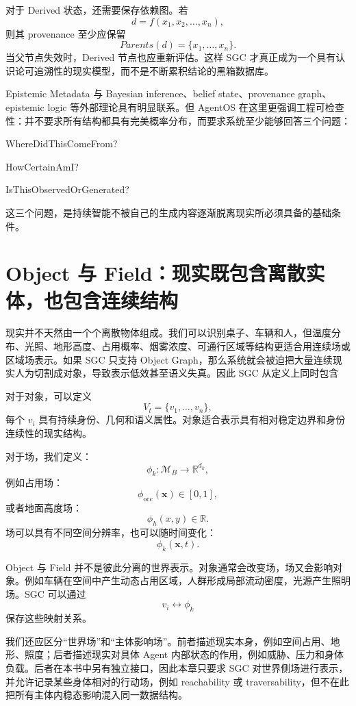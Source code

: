 对于 Derived 状态，还需要保存依赖图。若
\[
d=f(x_1,x_2,\ldots,x_n),
\]
则其 provenance 至少应保留
\[
Parents(d)=\{x_1,\ldots,x_n\}.
\]
当父节点失效时，Derived 节点也应重新评估。这样 SGC 才真正成为一个具有认识论可追溯性的现实模型，而不是不断累积结论的黑箱数据库。

Epistemic Metadata 与 Bayesian inference、belief state、provenance graph、epistemic logic 等外部理论具有明显联系。但 AgentOS 在这里更强调工程可检查性：并不要求所有结构都具有完美概率分布，而要求系统至少能够回答三个问题：
\begin{statementbox}
WhereDidThisComeFrom?
\end{statementbox}
\begin{statementbox}
HowCertainAmI?
\end{statementbox}
\begin{statementbox}
IsThisObservedOrGenerated?
\end{statementbox}
这三个问题，是持续智能不被自己的生成内容逐渐脱离现实所必须具备的基础条件。

\section{Object 与 Field：现实既包含离散实体，也包含连续结构}

现实并不天然由一个个离散物体组成。我们可以识别桌子、车辆和人，但温度分布、光照、地形高度、占用概率、烟雾浓度、可通行区域等结构更适合用连续场或区域场表示。如果 SGC 只支持 Object Graph，那么系统就会被迫把大量连续现实人为切割成对象，导致表示低效甚至语义失真。因此 SGC 从定义上同时包含
\begin{statementbox}
\centering
{}
\end{statementbox}

对于对象，可以定义
\[
V_t=\{v_1,\ldots,v_n\},
\]
每个 $v_i$ 具有持续身份、几何和语义属性。对象适合表示具有相对稳定边界和身份连续性的现实结构。

对于场，我们定义：
\[
\phi_k:
\mathcal M_B
\rightarrow
\mathbb R^{d_k},
\]
例如占用场：
\[
\phi_{\mathrm{occ}}(\mathbf x)\in[0,1],
\]
或者地面高度场：
\[
\phi_h(x,y)\in\mathbb R.
\]
场可以具有不同空间分辨率，也可以随时间变化：
\[
\phi_k(\mathbf x,t).
\]

Object 与 Field 并不是彼此分离的世界表示。对象通常会改变场，场又会影响对象。例如车辆在空间中产生动态占用区域，人群形成局部流动密度，光源产生照明场。SGC 可以通过
\[
v_i
\leftrightarrow
\phi_k
\]
保存这些映射关系。

我们还应区分“世界场”和“主体影响场”。前者描述现实本身，例如空间占用、地形、照度；后者描述现实对具体 Agent 内部状态的作用，例如威胁、压力和身体负载。后者在本书中另有独立接口，因此本章只要求 SGC 对世界侧场进行表示，并允许记录某些身体相对的行动场，例如 reachability 或 traversability，但不在此把所有主体内稳态影响混入同一数据结构。


